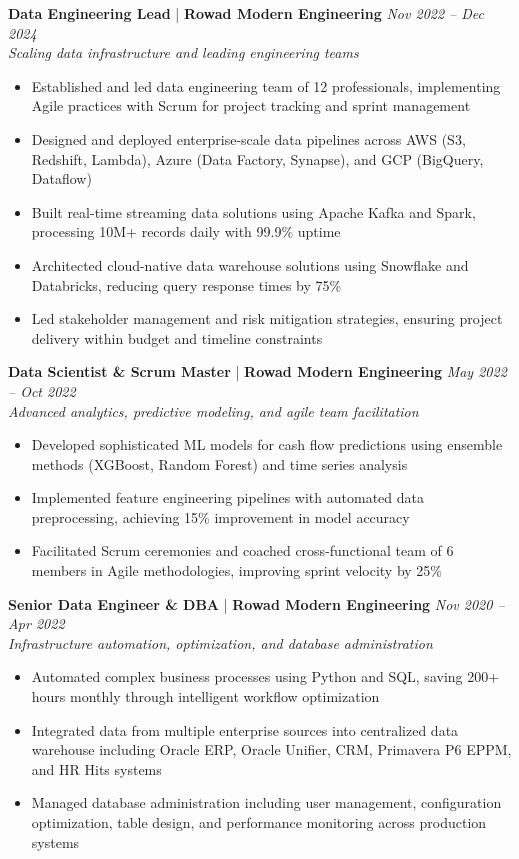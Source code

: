 \documentclass[10pt, letterpaper]{article}
\newcommand{\jobtitle}[4]{
    \textbf{\textcolor{primaryColor}{#1}} | \textbf{#2} \hfill \textit{#3} \\
    \textit{#4}
}
\begin{document}
\jobtitle{Data Engineering Lead}{Rowad Modern Engineering}{Nov 2022 – Dec 2024}{Scaling data infrastructure and leading engineering teams}
\begin{itemize}[leftmargin=1cm, itemsep=0.3ex]
    \item Established and led data engineering team of 12 professionals, implementing Agile practices with Scrum for project tracking and sprint management
    \item Designed and deployed enterprise-scale data pipelines across AWS (S3, Redshift, Lambda), Azure (Data Factory, Synapse), and GCP (BigQuery, Dataflow)
    \item Built real-time streaming data solutions using Apache Kafka and Spark, processing 10M+ records daily with 99.9\% uptime
    \item Architected cloud-native data warehouse solutions using Snowflake and Databricks, reducing query response times by 75\%
    \item Led stakeholder management and risk mitigation strategies, ensuring project delivery within budget and timeline constraints
\end{itemize}

\jobtitle{Data Scientist \& Scrum Master}{Rowad Modern Engineering}{May 2022 – Oct 2022}{Advanced analytics, predictive modeling, and agile team facilitation}
\begin{itemize}[leftmargin=1cm, itemsep=0.3ex]
    \item Developed sophisticated ML models for cash flow predictions using ensemble methods (XGBoost, Random Forest) and time series analysis
    \item Implemented feature engineering pipelines with automated data preprocessing, achieving 15\% improvement in model accuracy
    \item Facilitated Scrum ceremonies and coached cross-functional team of 6 members in Agile methodologies, improving sprint velocity by 25\%
\end{itemize}

\jobtitle{Senior Data Engineer \& DBA}{Rowad Modern Engineering}{Nov 2020 – Apr 2022}{Infrastructure automation, optimization, and database administration}
\begin{itemize}[leftmargin=1cm, itemsep=0.3ex]
    \item Automated complex business processes using Python and SQL, saving 200+ hours monthly through intelligent workflow optimization
    \item Integrated data from multiple enterprise sources into centralized data warehouse including Oracle ERP, Oracle Unifier, CRM, Primavera P6 EPPM, and HR Hits systems
    \item Managed database administration including user management, configuration optimization, table design, and performance monitoring across production systems
\end{itemize}
\end{document}
